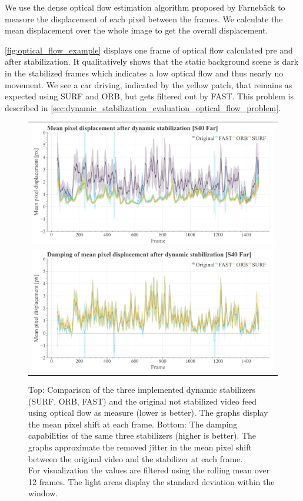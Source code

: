 We use the dense optical flow estimation algorithm proposed by Farnebäck \cite{farnback10.1007/3-540-45103-X_50,opencv_library} to measure the displacement of each pixel between the frames. 
We calculate the mean displacement over the whole image to get the overall displacement. 

\autoref{fig:optical_flow_example} displays one frame of optical flow calculated pre and after stabilization.
It qualitatively shows that the static background scene is dark in the stabilized frames which indicates a low optical flow and thus nearly no movement. 
We see a car driving, indicated by the yellow patch, that remains as expected using SURF and ORB, but gets filtered out by FAST. This problem is described in \autoref{sec:dynamic_stabilization_evaluation_optical_flow_problem}.     

\begin{figure}[t]
    \centering
    \begin{tabular}{c}
      \includegraphics[width=0.9\linewidth]{diagrams/optical_flow/mean_pixel_shifts_after_dynamic_stabilization_s40_far.png}    \\  
      \includegraphics[width=0.9\linewidth]{diagrams/optical_flow/damping_mean_pixel_shifts_after_dynamic_stabilization_s40_far.png}    
\end{tabular}
    \caption{Top: 
        Comparison of the three implemented dynamic stabilizers (SURF, ORB, FAST) and the original not stabilized video feed using optical flow as measure (lower is better).
        The graphs display the mean pixel shift at each frame. 
        Bottom: 
        The damping capabilities of the same three stabilizers (higher is better). 
        The graphs approximate the removed jitter in the mean pixel shift between the original video and the stabilizer at each frame.\\
        For visualization the values are filtered using the rolling mean over 12 frames. 
        The light areas display the standard deviation within the window.
    }
    \label{fig:dynamic_stabilization_s40_far}
\end{figure}

